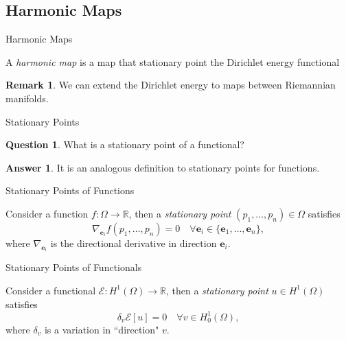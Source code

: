 \documentclass[usenames,dvipsnames]{beamer}
\theoremstyle{definition}
\newtheorem*{remark}{Remark}
\newtheorem*{question}{Question}
\newtheorem*{answer}{Answer}
\theoremstyle{theorem}
\newcommand{\R}{\mathbb{R}}
\begin{document}
\subsection{Harmonic Maps}

\begin{frame}{Harmonic Maps}
    \begin{definition}
    A \emph{harmonic map} is a map that stationary point the Dirichlet energy functional
    \end{definition}
    
    \begin{remark}
    We can extend the Dirichlet energy to maps between Riemannian manifolds.
    \end{remark}
\end{frame}

\begin{frame}{Stationary Points}
    \begin{question}
        What is a stationary point of a functional?
    \end{question}
    \pause
    \begin{answer}
        It is an analogous definition to stationary points for functions.
    \end{answer}
\end{frame}

\begin{frame}{Stationary Points of Functions}
\begin{definition}
    Consider a function $f\colon \Omega \to \R$, then a \emph{stationary point} $(p_1,\dots,p_n)\in \Omega$ satisfies
    \[
    \nabla_{\mathbf{e}_i} f(p_1,\dots,p_n) = 0 \quad \forall \mathbf{e}_i \in \{\mathbf{e}_1,\dots,\mathbf{e}_n\},
    \]
    where $\nabla_{\mathbf{e}_i}$ is the directional derivative in direction $\mathbf{e}_i$.
    \end{definition}
\end{frame}

\begin{frame}{Stationary Points of Functionals}
\begin{definition}
    Consider a functional $\mathcal{E}\colon H^1(\Omega) \to \R$, then a \emph{stationary point} $u\in H^1(\Omega)$ satisfies
    \[
    \delta_v \mathcal{E}[u]=0\quad \forall v \in H^1_0(\Omega),
    \]
    where $\delta_v$ is a variation in ``direction" $v$.
    \end{definition}
\end{frame}
\end{document}
